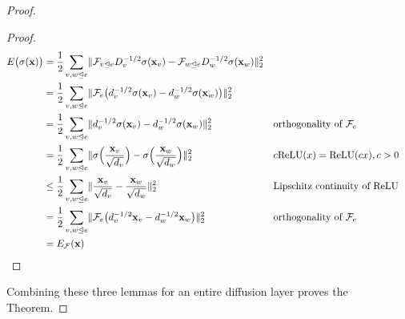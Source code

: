 \documentclass{article}
\def\vx{{\bf{x}}}
\def\gF{{\mathcal{F}}}
\newcommand{\tleq}{\trianglelefteq}
\DeclarePairedDelimiter{\norm}{\lVert}{\rVert}
\begin{document}
\begin{proof}
\begin{proof}
\begin{align}
    E\big(\sigma(\vx)\big) &= \frac{1}{2} \sum_{v,w \tleq e} \norm{\gF_{v \tleq e} D_{v}^{-1/2}\sigma(\vx_{v}) - \gF_{w \tleq e} D_{w}^{-1/2}\sigma(\vx_{w})}_2^2 \\
    &= \frac{1}{2} \sum_{v,w \tleq e} \norm{\gF_{e} \big(d_v^{-1/2}\sigma(\vx_{v}) - d_w^{-1/2}\sigma(\vx_{w}) \big)}_2^2 \\
    &= \frac{1}{2} \sum_{v,w \tleq e} \norm{d_v^{-1/2}\sigma(\vx_{v}) - d_w^{-1/2}\sigma(\vx_{w}) }_2^2 && \text{orthogonality of } \gF_e \\
    &= \frac{1}{2} \sum_{v,w \tleq e} \norm{\sigma\Big(\frac{\vx_{v}}{\sqrt{d_v}}\Big) - \sigma\Big(\frac{\vx_{w}}{\sqrt{d_w}}\Big) }_2^2 && c\text{ReLU}(x) = \text{ReLU}(cx), c > 0 \\
    &\leq \frac{1}{2} \sum_{v,w \tleq e} \norm{\frac{\vx_{v}}{\sqrt{d_v}} - \frac{\vx_{w}}{\sqrt{d_w}} }_2^2 && \text{Lipschitz continuity of ReLU} \\
    &= \frac{1}{2} \sum_{v,w \tleq e} \norm{\gF_{e} \big(d_v^{-1/2}\vx_{v} - d_w^{-1/2}\vx_{w} \big)}_2^2 && \text{orthogonality of } \gF_e  \\
    &= E_\gF(\vx)
\end{align}\end{proof}

Combining these three lemmas for an entire diffusion layer proves the Theorem. 
\end{proof}
\end{document}
